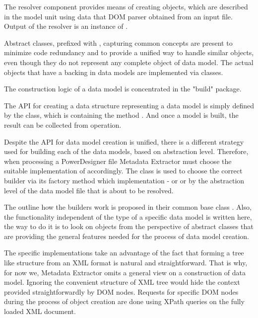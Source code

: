 The resolver component provides means of creating objects, which are described in the model unit using data that DOM parser obtained from an input file. Output of the resolver is an instance of .

Abstract classes, prefixed with , capturing common concepts are present to minimize code redundancy and to provide a unified way to handle similar objects, even though they do not represent any complete object of data model. 
The actual objects that have a backing in data models are implemented via  classes.

The construction logic of a data model is concentrated in the "build" package.

The API for creating a data structure representing a data model is simply defined by the   class, which is containing the method . And once a model is built, the result can be collected from  operation.

Despite the API for data model creation is unified, there is a different strategy used for building each of the data models, based on abstraction level. 
Therefore, when processing a PowerDesigner file Metadata Extractor must choose the suitable implementation of  accordingly. 
The class  is used to choose the correct builder via its factory method which implementation -  or  or  by the abstraction level of the data model file that is about to be resolved.

The outline how the builders work is proposed in their common base class . 
Also, the functionality independent of the type of a specific data model is written here, the way to do it is to look on objects from the perspective of abstract classes that are providing the general features needed for the process of data model creation.

The specific implementations take an advantage of the fact that forming a tree like structure from an XML format is natural and straightforward. That is why, for now we, Metadata Extractor omits a general view on a construction of data model. Ignoring the convenient structure of XML tree would hide the context provided straightforwardly by DOM nodes. 
Requests for specific DOM nodes during the process of object creation are done using XPath queries on the fully loaded XML document.

